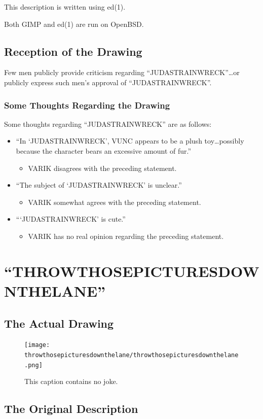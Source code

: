 \documentclass{report}
\begin{document}
This description is written using ed(1).

Both GIMP and ed(1) are run on OpenBSD.
\section{Reception of the Drawing}
Few men publicly provide criticism regarding ``JUDASTRAINWRECK''\ldots or publicly express such men's approval of ``JUDASTRAINWRECK''.
\subsection{Some Thoughts Regarding the Drawing}
Some thoughts regarding ``JUDASTRAINWRECK'' are as follows:
\begin{itemize}
	\item ``In `JUDASTRAINWRECK', VUNC appears to be a plush toy\ldots possibly because the character bears an excessive amount of fur.''
	\begin{itemize}
		\item VARIK disagrees with the preceding statement.
	\end{itemize}
	\item ``The subject of `JUDASTRAINWRECK' is unclear.''
	\begin{itemize}
		\item VARIK somewhat agrees with the preceding statement.
	\end{itemize}
	\item ```JUDASTRAINWRECK' is cute.''
	\begin{itemize}
		\item VARIK has no real opinion regarding the preceding statement.
	\end{itemize}
\end{itemize}
\chapter{``THROWTHOSEPICTURESDOWNTHELANE''}
\section{The Actual Drawing}
\begin{figure}[ht]
	\centering
	\texttt{[image: throwthosepicturesdownthelane/throwthosepicturesdownthelane.png]}
	\caption[center]{This caption contains no joke.}
\end{figure}
\section{The Original Description}
\end{document}

